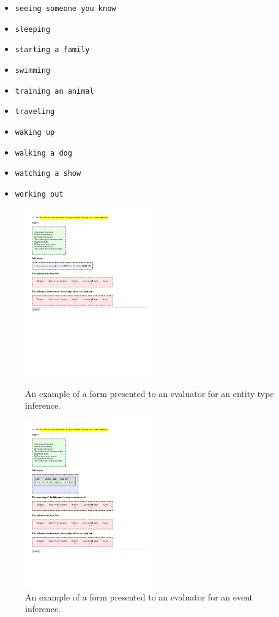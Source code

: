 {{\begin{multicols}{3}
\begin{itemize}
\item \texttt{seeing someone you know}
\item \texttt{sleeping}
\item \texttt{starting a family}
\item \texttt{swimming}
\item \texttt{training an animal}
\item \texttt{traveling}
\item \texttt{waking up}
\item \texttt{walking a dog}
\item \texttt{watching a show}
\item \texttt{working out}
\end{itemize}
\end{multicols}
}
}

\begin{figure}
    \centering
    \includegraphics[width=0.5\textwidth]{CH5_eval/role_inf.pdf}
    \caption{An example of a form presented to an evaluator for an entity type inference.}
    \label{fig:role_inf_eval}
        \includegraphics[width=0.5\textwidth]{CH5_eval/step_inf.pdf}
    \caption{An example of a form presented to an evaluator for an event inference.}
    \label{fig:step_inf_eval}
\end{figure}

